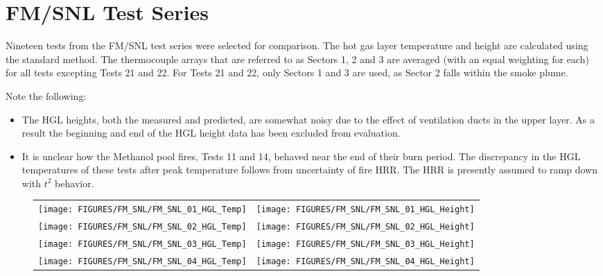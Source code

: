 \clearpage

\section{FM/SNL Test Series}

Nineteen tests from the FM/SNL test series were selected for comparison. The hot gas layer temperature and height are calculated using the
standard method. The thermocouple arrays that are referred to as Sectors 1, 2 and 3 are averaged (with an equal weighting for each) for all tests excepting Tests 21 and 22. For Tests 21 and 22, only Sectors 1 and 3 are used, as Sector 2 falls within the smoke plume.

Note the following:
\begin{itemize}
\item The HGL heights, both the measured and predicted, are somewhat noisy due to the effect of ventilation ducts in the upper layer. As a result the beginning and end of the HGL height data has been excluded from evaluation.
\item It is unclear how the Methanol pool fires, Tests 11 and 14, behaved  near the end of their burn period. The discrepancy in the HGL temperatures of these tests after peak temperature follows from uncertainty of fire HRR. The HRR is presently assumed to ramp down with $ t^2$ behavior.
\end{itemize}

\newpage

\begin{figure}[p]
\begin{tabular*}{\textwidth}{l@{\extracolsep{\fill}}r}
\texttt{[image: FIGURES/FM\_SNL/FM\_SNL\_01\_HGL\_Temp]} &
\texttt{[image: FIGURES/FM\_SNL/FM\_SNL\_01\_HGL\_Height]} \\
\texttt{[image: FIGURES/FM\_SNL/FM\_SNL\_02\_HGL\_Temp]} &
\texttt{[image: FIGURES/FM\_SNL/FM\_SNL\_02\_HGL\_Height]} \\
\texttt{[image: FIGURES/FM\_SNL/FM\_SNL\_03\_HGL\_Temp]} &
\texttt{[image: FIGURES/FM\_SNL/FM\_SNL\_03\_HGL\_Height]} \\
\texttt{[image: FIGURES/FM\_SNL/FM\_SNL\_04\_HGL\_Temp]} &
\texttt{[image: FIGURES/FM\_SNL/FM\_SNL\_04\_HGL\_Height]} \\
\end{tabular*}
\end{figure}

\newpage

